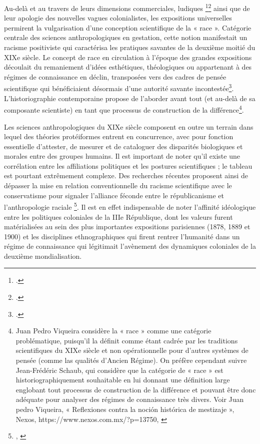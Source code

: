 \documentclass{article}
\begin{document}
	Au-delà et au travers de leurs dimensions commerciales, ludiques \footcite{demeulenaere-douyereEntreArcheologieSavante2014}\footcite{hauserEntreSoftPower2015} ainsi que de leur apologie des nouvelles vagues colonialistes, les expositions universelles permirent la vulgarisation d’une conception scientifique de la « race ». Catégorie centrale des sciences anthropologiques en gestation, cette notion manifestait un racisme positiviste qui caractérisa les pratiques savantes de la deuxième moitié du XIXe siècle. Le concept de race en circulation à l’époque des grandes expositions découlait du remaniement d’idées esthétiques, théologiques ou appartenant à des régimes de connaissance en déclin, transposées vers des cadres de pensée scientifique qui bénéficiaient désormais d’une autorité savante incontestée\footcite{blanckaertSpectaclesEthniquesCulture2002}. L’historiographie contemporaine propose de l’aborder avant tout (et au-delà de sa composante scientiste) en tant que processus de construction de la différence\footnote{Juan Pedro Viqueira considère la « race » comme une catégorie problématique, puisqu’il la définit comme étant cadrée par les traditions scientifiques du XIXe siècle et non opérationnelle pour d’autres systèmes de pensée (comme las qualités d’Ancien Régime). On préfère cependant suivre Jean-Frédéric Schaub, qui considère que la catégorie de « race » est historiographiquement souhaitable en lui donnant une définition large englobant tout processus de construction de la différence et pouvant être donc adéquate pour analyser des régimes de connaissance très divers. Voir Juan pedro Viqueira, « Reflexiones contra la noción histórica de mestizaje », Nexos, https://www.nexos.com.mx/?p=13750, \cite{schaubPourHistoirePolitique2015}}.
	
	Les sciences anthropologiques du XIXe siècle composent en outre un terrain dans lequel des théories protéiformes entrent en concurrence, avec pour fonction essentielle d’attester, de mesurer et de cataloguer des disparités biologiques et morales entre des groupes humains. Il est important de noter qu’il existe une corrélation entre les affiliations politiques et les postures scientifiques ; le tableau est pourtant extrêmement complexe. Des recherches récentes proposent ainsi de dépasser la mise en relation conventionnelle du racisme scientifique avec le conservatisme pour signaler l’alliance féconde entre le républicanisme et l’anthropologie raciale \footnote{\cite{conklinExposerHumaniteRace2015}, \cite{reynaudpaligotRepubliqueRaciale186019302015}}. Il est en effet indispensable de noter l’affinité idéologique entre les politiques coloniales de la IIIe République, dont les valeurs furent matérialisées au sein des plus importantes expositions parisiennes (1878, 1889 et 1900) et les disciplines ethnographiques qui firent rentrer l’humanité dans un régime de connaissance qui légitimait l’avènement des dynamiques coloniales de la deuxième mondialisation.
	
\end{document}
